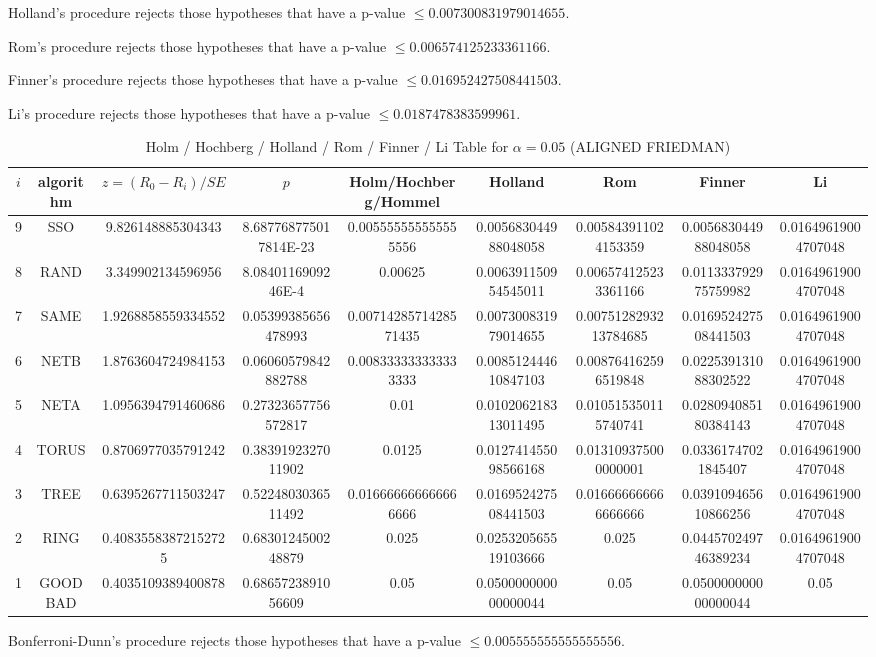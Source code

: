 \documentclass[a4paper,10pt]{article}
\begin{document}
\begin{landscape}
Holland's procedure rejects those hypotheses that have a p-value $\le0.007300831979014655$.


Rom's procedure rejects those hypotheses that have a p-value $\le0.006574125233361166$.


Finner's procedure rejects those hypotheses that have a p-value $\le0.016952427508441503$.


Li's procedure rejects those hypotheses that have a p-value $\le0.0187478383599961$.



\newpage

\begin{table}[!htp]
\centering\scriptsize
\caption{Holm / Hochberg / Holland / Rom / Finner / Li Table for $\alpha=0.05$ (ALIGNED FRIEDMAN)}
\begin{tabular}{ccccccccc}
$i$&algorithm&$z=(R_0 - R_i)/SE$&$p$&Holm/Hochberg/Hommel&Holland&Rom&Finner&Li\\
\hline
9& SSO&9.826148885304343&8.687768775017814E-23&0.005555555555555556&0.005683044988048058&0.005843911024153359&0.005683044988048058&0.01649619004707048\\
8& RAND&3.349902134596956&8.0840116909246E-4&0.00625&0.006391150954545011&0.006574125233361166&0.011333792975759982&0.01649619004707048\\
7& SAME&1.9268858559334552&0.05399385656478993&0.0071428571428571435&0.007300831979014655&0.0075128293213784685&0.016952427508441503&0.01649619004707048\\
6& NETB&1.8763604724984153&0.06060579842882788&0.008333333333333333&0.008512444610847103&0.008764162596519848&0.022539131088302522&0.01649619004707048\\
5& NETA&1.0956394791460686&0.27323657756572817&0.01&0.010206218313011495&0.010515350115740741&0.028094085180384143&0.01649619004707048\\
4& TORUS&0.8706977035791242&0.3839192327011902&0.0125&0.012741455098566168&0.013109375000000001&0.03361747021845407&0.01649619004707048\\
3& TREE&0.6395267711503247&0.5224803036511492&0.016666666666666666&0.016952427508441503&0.016666666666666666&0.039109465610866256&0.01649619004707048\\
2& RING&0.40835583872152725&0.6830124500248879&0.025&0.025320565519103666&0.025&0.044570249746389234&0.01649619004707048\\
1& GOODBAD&0.4035109389400878&0.6865723891056609&0.05&0.050000000000000044&0.05&0.050000000000000044&0.05\\
\hline
\end{tabular}
\end{table}
Bonferroni-Dunn's procedure rejects those hypotheses that have a p-value $\le0.005555555555555556$.



\end{landscape}
\end{document}
